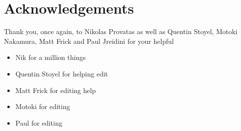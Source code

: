\section*{Acknowledgements}
\label{sec:acknowledgements}

Thank you, once again, to Nikolas Provatas as well as Quentin Stoyel, Motoki
Nakamura, Matt Frick and Paul Jreidini for your helpful

{
    \color{ForestGreen}
    \begin{itemize}
        \item Nik for a million things
        \item Quentin Stoyel for helping edit
        \item Matt Frick for editing help
        \item Motoki for editing
        \item Paul for editing
    \end{itemize}
}

